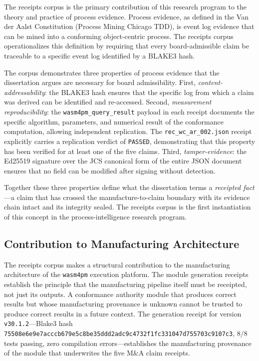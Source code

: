 The receipts corpus is the primary contribution of this research program to the theory
and practice of process evidence. Process evidence, as defined in the Van der Aalst
Constitution (Process Mining Chicago TDD), is event log evidence that can be mined into
a conforming object-centric process. The receipts corpus operationalizes this definition
by requiring that every board-admissible claim be traceable to a specific event log
identified by a BLAKE3 hash.

The corpus demonstrates three properties of process evidence that the dissertation
argues are necessary for board admissibility. First, \emph{content-addressability}:
the BLAKE3 hash ensures that the specific log from which a claim was derived can be
identified and re-accessed. Second, \emph{measurement reproducibility}: the
\texttt{wasm4pm\_query\_result} payload in each receipt documents the specific algorithm,
parameters, and numerical result of the conformance computation, allowing independent
replication. The \texttt{rec\_wc\_ar\_002.json} receipt explicitly carries a
replication verdict of \texttt{PASSED}, demonstrating that this property has been
verified for at least one of the five claims. Third, \emph{tamper-evidence}: the
Ed25519 signature over the JCS canonical form of the entire JSON document ensures
that no field can be modified after signing without detection.

Together these three properties define what the dissertation terms a \emph{receipted
fact}---a claim that has crossed the manufacture-to-claim boundary with its evidence
chain intact and its integrity sealed. The receipts corpus is the first instantiation
of this concept in the process-intelligence research program.

\subsection{Contribution to Manufacturing Architecture}
\label{sec:receipts-contribution-manufacturing}

The receipts corpus makes a structural contribution to the manufacturing architecture
of the \texttt{wasm4pm} execution platform. The module generation receipts establish
the principle that the manufacturing pipeline itself must be receipted, not just its
outputs. A conformance authority module that produces correct results but whose
manufacturing provenance is unknown cannot be trusted to produce correct results
in a future context. The generation receipt for version \texttt{v30.1.2}---Blake3
hash \texttt{75508e6e9e7acccb679e5c8be35ddd2adc9c4732f1fc331047d755703c9107c3},
$8/8$ tests passing, zero compilation errors---establishes the manufacturing provenance
of the module that underwrites the five M\&A claim receipts.

